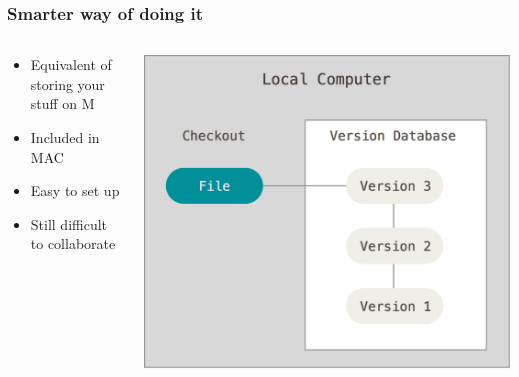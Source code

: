 \begin{frame}
	\frametitle{Smarter way of doing it}
	\begin{columns}
		\begin{column}{0.5\textwidth}
			\begin{itemize}[<+->]
				\item Equivalent of storing your stuff on M
				\item Included in MAC
				\item Easy to set up
				\item Still difficult to collaborate
			\end{itemize}
		\end{column}
		\begin{column}{0.5\textwidth}
			\includegraphics[width=\textwidth]{./pictures/local.png}
		\end{column}
	\end{columns}
\end{frame}

